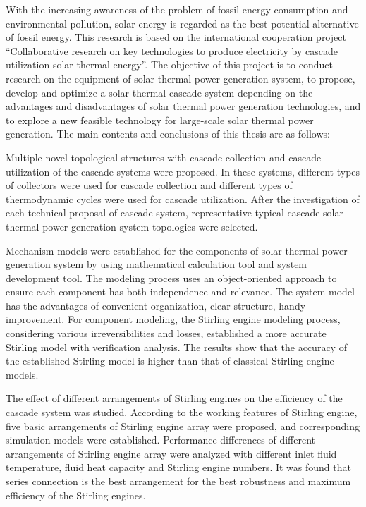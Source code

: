 \enabstract
{
With the increasing awareness of the problem of fossil energy consumption and environmental pollution, solar energy is regarded as the best potential alternative of fossil energy. This research is based on the international cooperation project ``Collaborative research on key technologies to produce electricity by cascade utilization solar thermal energy''. The objective of this project is to conduct research on the equipment of solar thermal power generation system, to propose, develop and optimize a solar thermal cascade system depending on the advantages and disadvantages of solar thermal power generation technologies, and to explore a new feasible technology for large-scale solar thermal power generation. The main contents and conclusions of this thesis are as follows:

Multiple novel topological structures with cascade collection and cascade utilization of the cascade systems were proposed. In these systems, different types of collectors were used for cascade collection and different types of thermodynamic cycles were used for cascade utilization. After the investigation of each technical proposal of cascade system, representative typical cascade solar thermal power generation system topologies were selected.

Mechanism models were established for the components of solar thermal power generation system by using mathematical calculation tool and system development tool. The modeling process uses an object-oriented approach to ensure each component has both independence and relevance. The system model has the advantages of convenient organization, clear structure, handy improvement. For component modeling, the Stirling engine modeling process, considering various irreversibilities and losses, established a more accurate Stirling model with verification analysis. The results show that the accuracy of the established Stirling model is higher than that of classical Stirling engine models.

The effect of different arrangements of Stirling engines on the efficiency of the cascade system was studied. 
According to the working features of Stirling engine, five basic arrangements of Stirling engine array were proposed, and corresponding simulation models were established.
Performance differences of different arrangements of Stirling engine array were analyzed with different inlet fluid temperature, fluid heat capacity and Stirling engine numbers.
It was found that series connection is the best arrangement for the best robustness and maximum efficiency of the Stirling engines.

}
